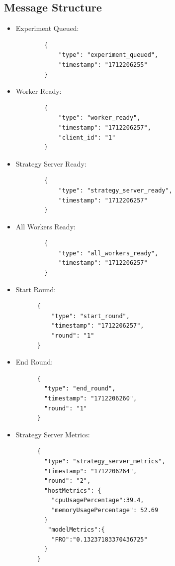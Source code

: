\subsection{Message Structure}
\begin{itemize}
    \item Experiment Queued:
          \begin{verbatim}
        {
            "type": "experiment_queued",
            "timestamp": "1712206255"
        }
    \end{verbatim}

    \item Worker Ready:
          \begin{verbatim}
        {
            "type": "worker_ready",
            "timestamp": "1712206257",
            "client_id": "1"
        }
    \end{verbatim}

    \item Strategy Server Ready:
          \begin{verbatim}
        {
            "type": "strategy_server_ready",
            "timestamp": "1712206257"
        }
    \end{verbatim}

    \item All Workers Ready:
          \begin{verbatim}
        {
            "type": "all_workers_ready",
            "timestamp": "1712206257"
        }
    \end{verbatim}

    \item Start Round:
    \begin{verbatim}
      {
          "type": "start_round",
          "timestamp": "1712206257",
          "round": "1"
      }
    \end{verbatim}
    
     \newpage

    \item End Round:
      \begin{verbatim}
      {
        "type": "end_round",
        "timestamp": "1712206260",
        "round": "1"
      }
    \end{verbatim}

    \item Strategy Server Metrics:
      \begin{verbatim}
      {
        "type": "strategy_server_metrics",
        "timestamp": "1712206264",
        "round": "2",
        "hostMetrics": {
          "cpuUsagePercentage":39.4,
          "memoryUsagePercentage": 52.69
        }
         "modelMetrics":{
          "FRO":"0.13237183370436725"
        }
      }
    \end{verbatim}
\end{itemize}

